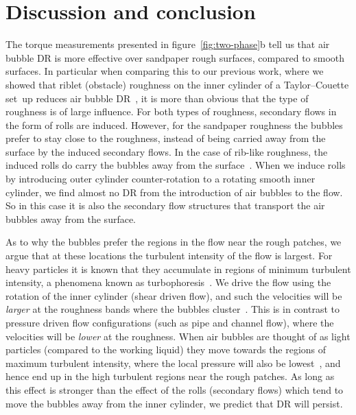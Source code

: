 \documentclass[aps,twocolumn,10pt,floatfix, superscriptaddress,longbibliography,pra]{revtex4-1}
\begin{document}
\section{Discussion and conclusion}
The torque measurements presented in figure~\ref{fig:two-phase}b tell us that air bubble DR is more effective over sandpaper rough surfaces, compared to smooth surfaces. In particular when comparing this to our previous work, where we showed that riblet (obstacle) roughness on the inner cylinder of a Taylor--Couette set~up reduces air bubble DR~\citep{Verschoof2018}, it is more than obvious that the type of roughness is of large influence. For both types of roughness, secondary flows in the form of rolls are induced. However, for the sandpaper roughness the bubbles prefer to stay close to the roughness, instead of being carried away from the surface by the induced secondary flows. In the case of rib-like roughness, the induced rolls do carry the bubbles away from the surface~\citep{Verschoof2018}. When we induce rolls by introducing outer cylinder counter-rotation to a rotating smooth inner cylinder, we find almost no DR from the introduction of air bubbles to the flow. So in this case it is also the secondary flow structures that transport the air bubbles away from the surface.

As to why the bubbles prefer the regions in the flow near the rough patches, we argue that at these locations the turbulent intensity of the flow is largest. For heavy particles it is known that they accumulate in regions of minimum turbulent intensity, a phenomena known as turbophoresis~\citep{Reeks1983,Marchioli2002}. We drive the flow using the rotation of the inner cylinder (shear driven flow), and such the velocities will be \textit{larger} at the roughness bands where the bubbles cluster~\citep{Bakhuis2019}. This is in contrast to pressure driven flow configurations (such as pipe and channel flow), where the velocities will be \textit{lower} at the roughness. When air bubbles are thought of as light particles (compared to the working liquid) they move towards the regions of maximum turbulent intensity, where the local pressure will also be lowest~\citep{Mazzitelli2003,Climent2007,Loisy2017,Elghobashi2019,Mathai2019}, and hence end up in the high turbulent regions near the rough patches. As long as this effect is stronger than the effect of the rolls (secondary flows) which tend to move the bubbles away from the inner cylinder, we predict that DR will persist.
\end{document}
